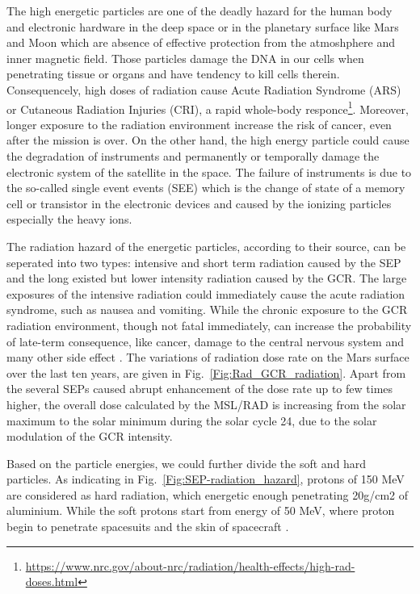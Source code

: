 The high energetic particles are one of the deadly hazard for the human body and electronic hardware in the deep space or in the planetary surface like Mars and Moon which are absence of effective protection from the atmoshphere and inner magnetic field.
Those particles damage the \ac{DNA} in our cells when penetrating tissue or organs and have tendency to kill cells therein. Consequencely, high doses of radiation cause Acute Radiation Syndrome (ARS) or Cutaneous Radiation Injuries (CRI), a rapid whole-body responce\footnote{\url{https://www.nrc.gov/about-nrc/radiation/health-effects/high-rad-doses.html}}. Moreover, longer exposure to the radiation environment increase the risk of cancer, even after the mission is over.
On the other hand, the high energy particle could cause the degradation of instruments and permanently or temporally damage the electronic system of the satellite in the space. The failure of instruments is due to the so-called single event events (SEE) which is the change of state of a memory cell or transistor in the electronic devices and caused by the ionizing particles especially the heavy ions.



The radiation hazard of the energetic particles, according to their source, can be seperated into two types: intensive and short term radiation caused by the \ac{SEP} and the long existed but lower intensity radiation caused by the \ac{GCR}.
The large exposures of the intensive radiation could immediately cause the acute radiation syndrome, such as nausea and vomiting. While the chronic exposure to the GCR radiation environment, though not fatal immediately, can increase the probability of late-term consequence, like cancer, damage to the central nervous system and many other side effect \citep{Guo2021AARv, Cucunotta and Durant 2006, Kennedy 2014, Iancu 2018}. 
The variations of radiation dose rate on the Mars surface over the last ten years, are given in Fig.~\ref{Fig:Rad_GCR_radiation}. Apart from the several \acp{SEP} caused abrupt enhancement of the dose rate up to few times higher, the overall dose calculated by the MSL/RAD is increasing from the solar maximum to the solar minimum during the solar cycle 24, due to the solar modulation of the GCR intensity.

Based on the particle energies, we could further divide the soft and hard particles.
As indicating in Fig.~\ref{Fig:SEP-radiation_hazard}, protons of 150 MeV are considered as hard radiation, which energetic enough penetrating 20g/cm2 of aluminium. While the soft protons start from energy of 50 MeV, where proton begin to penetrate spacesuits and the skin of spacecraft \citep{Reames2021LNP}. 


